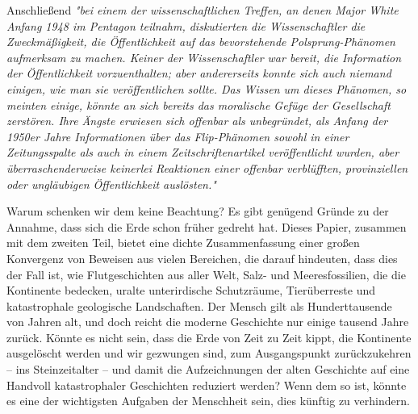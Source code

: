 \documentclass[10pt,twocolumn,letterpaper]{article}
\begin{document}
Anschließend \textit{"bei einem der wissenschaftlichen Treffen, an denen Major White Anfang 1948 im Pentagon teilnahm, diskutierten die Wissenschaftler die Zweckmäßigkeit, die Öffentlichkeit auf das bevorstehende Polsprung-Phänomen aufmerksam zu machen. Keiner der Wissenschaftler war bereit, die Information der Öffentlichkeit vorzuenthalten; aber andererseits konnte sich auch niemand einigen, wie man sie veröffentlichen sollte. Das Wissen um dieses Phänomen, so meinten einige, könnte an sich bereits das moralische Gefüge der Gesellschaft zerstören. Ihre Ängste erwiesen sich offenbar als unbegründet, als Anfang der 1950er Jahre Informationen über das Flip-Phänomen sowohl in einer Zeitungsspalte als auch in einem Zeitschriftenartikel veröffentlicht wurden, aber überraschenderweise keinerlei Reaktionen einer offenbar verblüfften, provinziellen oder ungläubigen Öffentlichkeit auslösten."} \cite{138,139}

Warum schenken wir dem keine Beachtung? Es gibt genügend Gründe zu der Annahme, dass sich die Erde schon früher gedreht hat. Dieses Papier, zusammen mit dem zweiten Teil, bietet eine dichte Zusammenfassung einer großen Konvergenz von Beweisen aus vielen Bereichen, die darauf hindeuten, dass dies der Fall ist, wie Flutgeschichten aus aller Welt, Salz- und Meeresfossilien, die die Kontinente bedecken, uralte unterirdische Schutzräume, Tierüberreste und katastrophale geologische Landschaften. Der Mensch gilt als Hunderttausende von Jahren alt, und doch reicht die moderne Geschichte nur einige tausend Jahre zurück. Könnte es nicht sein, dass die Erde von Zeit zu Zeit kippt, die Kontinente ausgelöscht werden und wir gezwungen sind, zum Ausgangspunkt zurückzukehren – ins Steinzeitalter – und damit die Aufzeichnungen der alten Geschichte auf eine Handvoll katastrophaler Geschichten reduziert werden? Wenn dem so ist, könnte es eine der wichtigsten Aufgaben der Menschheit sein, dies künftig zu verhindern.
\end{document}
